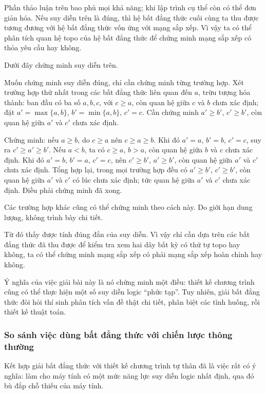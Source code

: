 \documentclass[11pt]{article}
\begin{document}
Phần thảo luận trên bao phủ mọi khả năng; khi lập trình cụ thể còn có thể
đơn giản hóa. Nếu suy diễn trên là đúng, thì hệ bất đẳng thức cuối cùng ta
thu được tương đương với hệ bất đẳng thức vốn ứng với mạng sắp xếp. Vì vậy ta
có thể phân tích quan hệ topo của hệ bất đẳng thức để chứng minh mạng sắp xếp
có thỏa yêu cầu hay không.

Dưới đây chứng minh suy diễn trên.

Muốn chứng minh suy diễn đúng, chỉ cần chứng minh từng trường hợp. Xét trường
hợp thứ nhất trong các bất đẳng thức liên quan đến \(a\), trừu tượng hóa
thành: ban đầu có ba số \(a,b,c\), với \(c\ge a\), còn quan hệ giữa \(c\) và
\(b\) chưa xác định; đặt \(a'=\max\{a,b\}\), \(b'=\min\{a,b\}\), \(c'=c\).
Cần chứng minh \(a'\ge b'\), \(c'\ge b'\), còn quan hệ giữa \(a'\) và \(c'\)
chưa xác định.

Chứng minh: nếu \(a\ge b\), do \(c\ge a\) nên \(c\ge a\ge b\). Khi đó
\(a'=a\), \(b'=b\), \(c'=c\), suy ra \(c'\ge a'\ge b'\). Nếu \(a<b\), ta có
\(c\ge a\), \(b>a\), còn quan hệ giữa \(b\) và \(c\) chưa xác định. Khi đó
\(a'=b\), \(b'=a\), \(c'=c\), nên \(c'\ge b'\), \(a'\ge b'\), còn quan hệ
giữa \(a'\) và \(c'\) chưa xác định. Tổng hợp lại, trong mọi trường hợp đều
có \(a'\ge b'\), \(c'\ge b'\), còn quan hệ giữa \(a'\) và \(c'\) có lúc chưa
xác định; tức quan hệ giữa \(a'\) và \(c'\) chưa xác định. Điều phải chứng
minh đã xong.

Các trường hợp khác cũng có thể chứng minh theo cách này. Do giới hạn dung
lượng, không trình bày chi tiết.

Từ đó thấy được tính đúng đắn của suy diễn. Vì vậy chỉ cần dựa trên các bất
đẳng thức đã thu được để kiểm tra xem hai dây bất kỳ có thứ tự topo hay
không, ta có thể chứng minh mạng sắp xếp có phải mạng sắp xếp hoàn chỉnh hay
không.

Ý nghĩa của việc giải bài này là nó chứng minh một điều: thiết kế chương
trình cũng có thể thực hiện một số suy diễn logic ``phức tạp''. Tuy nhiên,
giải bất đẳng thức đòi hỏi thí sinh phân tích vấn đề thật chi tiết, phân biệt
các tình huống, rồi thiết kế thuật toán.

\subsubsection{So sánh việc dùng bất đẳng thức với chiến lược thông thường}

Kết hợp giải bất đẳng thức với thiết kế chương trình tự thân đã là việc rất
có ý nghĩa: làm cho máy tính có một mức năng lực suy diễn logic nhất định,
qua đó bù đắp chỗ thiếu của máy tính.
\end{document}
